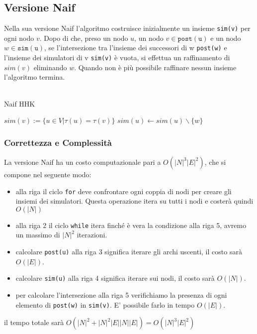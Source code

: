 \subsection{Versione Naif}
\label{sec:naif}
Nella sua versione Naif l'algoritmo costruisce inizialmente un insieme \texttt{sim(v)} per ogni nodo $v$. Dopo di che, preso un nodo $u$, un nodo $v \in \mathtt{post(u)}$ e un nodo $w \in \mathtt{sim(u)}$, se l'intersezione tra l'insieme dei successori di w \texttt{post(w)} e l'insieme dei simulatori di v \texttt{sim(v)} è vuota, si effettua un raffinamento di $sim(v)$ eliminando $w$. Quando non è più possibile raffinare nessun insieme l'algoritmo termina.
\\\\
\begin{algorithm}
\caption{Naif HHK}
\begin{algorithmic}[1]
    $sim(v) := \{u \in V|\tau(u)=\tau(v)\}$  
\EndFor
{}
\State $sim(u)\gets sim(u) \backslash \{w\}$
\EndWhile
\end{algorithmic}
\end{algorithm}
\subsubsection{Correttezza e Complessità}
La versione Naif ha un costo computazionale pari a $O(|N|^3|E|^2)$, che si compone nel seguente modo:
\begin{itemize}
\item alla riga il ciclo \texttt{for} deve confrontare ogni coppia di nodi per creare gli insiemi dei simulatori. Questa operazione itera su tutti i nodi e costerà quindi $O(|N|)$
\item alla riga 2 il ciclo \texttt{while} itera finché è vera la condizione alla riga 5, avremo un massimo di $|N|^2$ iterazioni.
\item calcolare \texttt{post(u)} alla riga 3 significa iterare gli archi uscenti, il costo sarà $O(|E|)$.
\item calcolare \texttt{sim(u)} alla riga 4 significa iterare sui nodi, il costo sarà $O(|N|)$.
\item per calcolare l'intersezione alla riga 5 verifichiamo la presenza di ogni elemento  di \texttt{post(w)} in \texttt{sim(v)}. E' possibile farlo in tempo $O(|E|)$.
\end{itemize}
il tempo totale sarà $O(|N|^2 + |N|^2|E||N||E|) = O(|N|^3|E|^2)$
